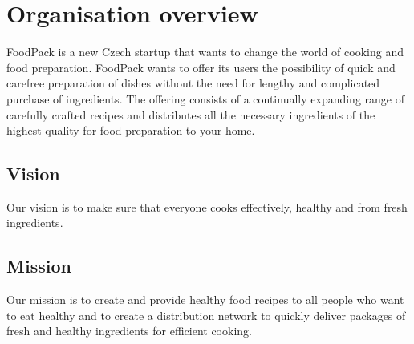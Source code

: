 \documentclass[11pt,a4paper]{article}
\begin{document}
\setlength{\parskip}{0pt}
    \hypersetup{hidelinks}\tableofcontents
\setlength{\parskip}{0pt}

\newpage

\section{Organisation overview}

FoodPack is a new Czech startup that wants to change the world of cooking and food preparation. FoodPack wants to offer its users the possibility of quick and carefree preparation of dishes without the need for lengthy and complicated purchase of ingredients. The offering consists of a continually expanding range of carefully crafted recipes and distributes all the necessary ingredients of the highest quality for food preparation to your home.

\subsection{Vision}

Our vision is to make sure that everyone cooks effectively, healthy and from fresh ingredients.

\subsection{Mission}

Our mission is to create and provide healthy food recipes to all people who want to eat healthy and to create a distribution network to quickly deliver packages of fresh and healthy ingredients for efficient cooking.
\end{document}
